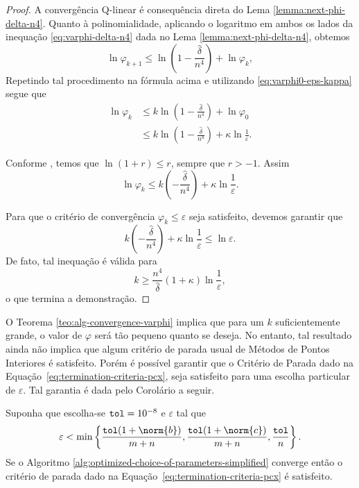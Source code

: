 \begin{proof} A convergência Q-linear é consequência direta do Lema \ref{lemma:next-phi-delta-n4}. Quanto à polinomialidade, aplicando o logaritmo em ambos os lados da inequação \eqref{eq:varphi-delta-n4} dada no Lema \ref{lemma:next-phi-delta-n4}, obtemos
	\[
	\ln\varphi_{k+1}\leq \ln \left(1 - \frac{\hat{\delta}}{n^{4}}\right) + \ln\varphi_{k},
	\]
Repetindo tal procedimento na fórmula acima e utilizando \eqref{eq:varphi0-eps-kappa} segue que
\[
	\begin{aligned}
		\ln\varphi_{k} & \leq k \ln\left(1 - \frac{\hat{\delta}}{n^{4}}\right) + \ln \varphi_{0} \\
					& \leq k \ln\left(1 - \frac{\hat{\delta}}{n^{4}}\right) + \kappa\ln \frac{1}{\varepsilon}. 
	\end{aligned}
\] 

Conforme \textcite[Lema 4.1, pg 68]{Wright:Primal-dual-interior-point:1997h}, temos que $\ln(1+r) \leq r$, sempre que $r>-1$. Assim
\[
	\ln\varphi_{k}\leq k \left(- \frac{\hat{\delta}}{n^{4}}\right) + \kappa\ln \frac{1}{\varepsilon}.
\] 

Para que o critério de convergência $\varphi_{k}\leq\varepsilon$ seja satisfeito, devemos garantir que 
\[
	k \left(- \frac{\hat{\delta}}{n^{4}}\right) + \kappa\ln \frac{1}{\varepsilon} \leq \ln\varepsilon.
\] 
De fato, tal inequação é válida para 
\[
	k \geq \dfrac{n^{4}}{\hat{\delta}}(1+\kappa)\ln\frac{1}{\varepsilon},
\]
o que termina a demonstração.
\end{proof}




O Teorema \ref{teo:alg-convergence-varphi} implica que para um $k$ suficientemente grande, o valor de $\varphi$ será tão pequeno quanto se deseja. No entanto, tal resultado ainda não implica que algum critério de parada usual de Métodos de Pontos Interiores é satisfeito. Porém é possível garantir que o Critério de Parada dado na Equação~\eqref{eq:termination-criteria-pcx}, seja satisfeito para uma escolha particular de $\varepsilon$. Tal garantia é dada pelo Corolário a seguir.

\begin{corol}
Suponha que escolha-se  $\mathtt{tol} = 10^{-8}$  e $\varepsilon$   tal que 
\begin{equation}
	\label{eq:choosing-eps}
		\varepsilon < \min\left\{  \frac{\tol(1+\norm{b})}{m+n}, \frac{\tol(1+\norm{c})}{m+n},\frac{\tol}{n}\right\}.
\end{equation}
Se o Algoritmo \ref{alg:optimized-choice-of-parameters-simplified} converge então o critério de parada dado na Equação~\eqref{eq:termination-criteria-pcx} é satisfeito.
\end{corol}		


